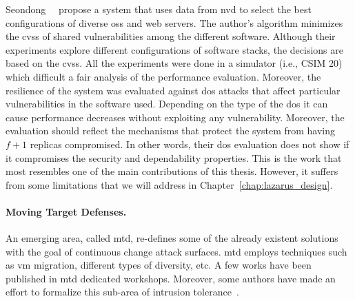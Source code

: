 Seondong~\etal{}~\cite{Seondong:2017} propose a system that uses data from \gls{nvd} to select the best configurations of diverse \glspl{os} and web servers.
The author's algorithm minimizes the \gls{cvss} of shared vulnerabilities among the different software.
Although their experiments explore different configurations of software stacks, the decisions are based on the \gls{cvss}.
All the experiments were done in a simulator (i.e., CSIM 20) which difficult a fair analysis of the performance evaluation. 
Moreover, the resilience of the system was evaluated against \gls{dos} attacks that affect particular vulnerabilities in the software used.
Depending on the type of the \gls{dos} it can cause performance decreases without exploiting any vulnerability.
Moreover, the evaluation should reflect the mechanisms that protect the system from having $f+1$ replicas compromised.
In other words, their \gls{dos} evaluation does not show if it compromises the security and dependability properties. 
This is the work that most resembles one of the main contributions of this thesis. 
However, it suffers from some limitations that we will address in Chapter~\ref{chap:lazarus_design}.



\paragraph{Moving Target Defenses.} 
An emerging area, called \gls{mtd}, re-defines some of the already existent solutions with the goal of continuous change attack surfaces. 
\gls{mtd} employs techniques such as  \gls{vm} migration, different types of diversity, etc.
A few works have been published in \gls{mtd} dedicated workshops.
Moreover, some authors have made an effort to formalize this sub-area of intrusion tolerance~\cite{Zhuang:2014}.  

